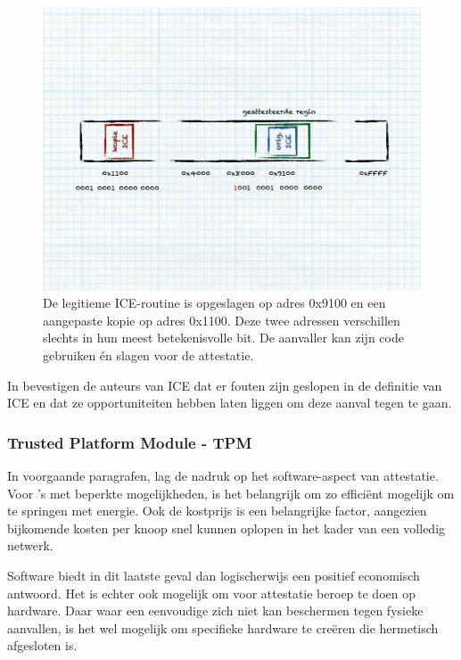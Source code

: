 \begin{figure}[ht]
  \centering
  \includegraphics[width=0.9\linewidth]{resources/attestation-ice-copy.pdf}
  \caption[Omzeilen van ICE-gebaseerde software-attestatie]{De legitieme
  ICE-routine is opgeslagen op adres 0x9100 en een aangepaste kopie op adres
  0x1100. Deze twee adressen verschillen slechts in hun meest betekenisvolle
  bit. De aanvaller kan zijn code gebruiken \'en slagen voor de attestatie.}
  \label{fig:attestation-ice-copy}
\end{figure}

In \citep{perrig2010refutation} bevestigen de auteurs van ICE dat er fouten
zijn geslopen in de definitie van ICE en dat ze opportuniteiten hebben laten
liggen om deze aanval tegen te gaan.

\subsubsection*{Trusted Platform Module - TPM}

In voorgaande paragrafen, lag de nadruk op het software-aspect van attestatie.
Voor \mcu's met beperkte mogelijkheden, is het belangrijk om zo effici\"ent
mogelijk om te springen met energie. Ook de kostprijs is een belangrijke
factor, aangezien bijkomende kosten per knoop snel kunnen oplopen in het kader
van een volledig netwerk.

Software biedt in dit laatste geval dan logischerwijs een positief economisch
antwoord. Het is echter ook mogelijk om voor attestatie beroep te doen op
hardware. Daar waar een eenvoudige \mcu zich niet kan beschermen tegen fysieke
aanvallen, is het wel mogelijk om specifieke hardware te cre\"eren die
hermetisch afgesloten is.


